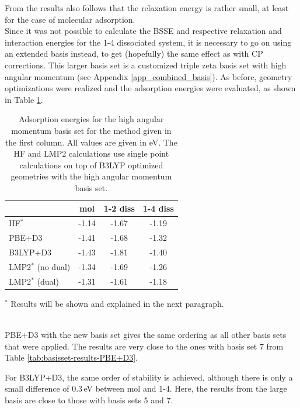 \documentclass[11pt,DIV=13,BCOR=5mm,a4paper,headinclude]{scrbook}
\begin{document}
From the results also follows that the relaxation energy is rather small, at least for the case of molecular adsorption. %
\\

Since it was not possible to calculate the BSSE and respective relaxation and interaction energies for the 1-4 dissociated system, it is necessary to go on using an extended basis instead, to get (hopefully) the same effect as with CP corrections.
This larger basis set is a customized triple zeta basis set with high angular momentum (see Appendix \ref{app_combined_basis}).
As before, geometry optimizations were realized and the adsorption energies were evaluated, as shown in Table \ref{tab:combined_results}.
\begin{table}[!h]
  \centering
   \caption{Adsorption energies for the high angular momentum basis set for the method given in the first column.
All values are given in eV. The HF and LMP2 calculations use single point calculations on top of B3LYP optimized geometries with the high angular momentum basis set.}
  \begin{tabular}{l|ccc}
  \toprule
   &mol & 1-2 diss & 1-4 diss \\\midrule
HF$^\ast$ &-1.14 & -1.67 & -1.19\\
PBE+D3 & -1.41 & -1.68 & -1.32 \\
B3LYP+D3 & -1.43 & -1.81 & -1.40 \\
LMP2$^\ast$ (no dual) & -1.34 & -1.69 & -1.26\\
LMP2$^\ast$ (dual) & -1.31 & -1.61 & -1.18 \\ %
\bottomrule
  \end{tabular}
  \begin{tablenotes}
 \footnotesize
\item[] $^\ast$ Results will be shown and explained in the next paragraph.
  \end{tablenotes}
  \label{tab:combined_results}
\end{table}
\\

PBE+D3 with the new basis set gives the same ordering as all other basis sets that were applied.
The results are very close to the ones with basis set 7 from Table \ref{tab:basisset-results-PBE+D3}.


For B3LYP+D3, the same order of stability is achieved, although there is only a small difference of $0.3\,$eV between mol and 1-4.
Here, the results from the large basis are close to those with basis sets 5 and 7.
\\
\end{document}
